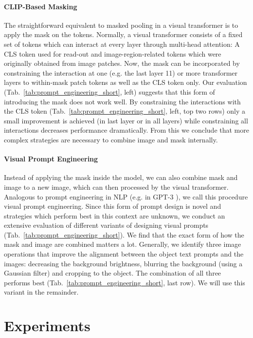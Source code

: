 \paragraph{CLIP-Based Masking}
The straightforward equivalent to masked pooling in a visual transformer is to apply the mask on the tokens. Normally, a visual transformer consists of a fixed set of tokens which can interact at every layer through multi-head attention: A CLS token used for read-out and image-region-related tokens which were originally obtained from image patches. 
Now, the mask can be incorporated by constraining the interaction at one (e.g. the last layer 11) or more transformer layers to within-mask patch tokens as well as the CLS token only.
Our evaluation (Tab.~\ref{tab:prompt_engineering_short}, left) suggests that this form of introducing the mask does not work well. By constraining the interactions with the CLS token (Tab.~\ref{tab:prompt_engineering_short}, left, top two rows) only a small improvement is achieved (in last layer or in all layers) while constraining all interactions decreases performance dramatically. From this we conclude that more complex strategies are necessary to combine image and mask internally.

\paragraph{Visual Prompt Engineering}
Instead of applying the mask inside the model, we can also combine mask and image to a new image, which can then processed by the visual transformer.
Analogous to prompt engineering in NLP (e.g. in GPT-3 \cite{brown20}), we call this procedure visual prompt engineering. Since this form of prompt design is novel and strategies which perform best in this context are unknown, we conduct an extensive evaluation of different variants of designing visual prompts (Tab.~\ref{tab:prompt_engineering_short}).
We find that the exact form of how the mask and image are combined matters a lot. Generally, we identify three image operations that improve the alignment between the object text prompts and the images: decreasing the background brightness, blurring the background (using a Gaussian filter) and cropping to the object. The combination of all three performs best (Tab.~\ref{tab:prompt_engineering_short}, last row). We will use this variant in the remainder.

\section{Experiments}

